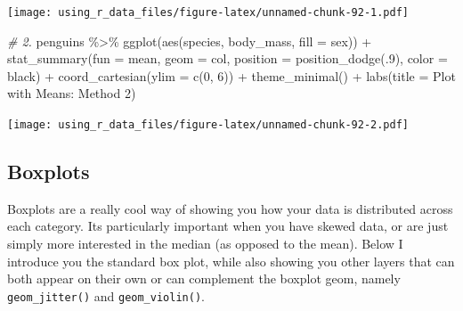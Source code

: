 \documentclass[
]{book}
\newenvironment{Shaded}{\begin{snugshade}}{\end{snugshade}}
\newcommand{\AttributeTok}[1]{\textcolor[rgb]{0.77,0.63,0.00}{#1}}
\newcommand{\CommentTok}[1]{\textcolor[rgb]{0.56,0.35,0.01}{\textit{#1}}}
\newcommand{\DecValTok}[1]{\textcolor[rgb]{0.00,0.00,0.81}{#1}}
\newcommand{\FunctionTok}[1]{\textcolor[rgb]{0.00,0.00,0.00}{#1}}
\newcommand{\NormalTok}[1]{#1}
\newcommand{\SpecialCharTok}[1]{\textcolor[rgb]{0.00,0.00,0.00}{#1}}
\newcommand{\StringTok}[1]{\textcolor[rgb]{0.31,0.60,0.02}{#1}}
\begin{document}
\texttt{[image: using\_r\_data\_files/figure-latex/unnamed-chunk-92-1.pdf]}

\begin{Shaded}
\begin{Highlighting}[]
\CommentTok{\# 2.}
\NormalTok{penguins }\SpecialCharTok{\%\textgreater{}\%} 
  \FunctionTok{ggplot}\NormalTok{(}\FunctionTok{aes}\NormalTok{(species, body\_mass, }\AttributeTok{fill =}\NormalTok{ sex)) }\SpecialCharTok{+}
  \FunctionTok{stat\_summary}\NormalTok{(}\AttributeTok{fun =}\NormalTok{ mean, }\AttributeTok{geom =} \StringTok{\textquotesingle{}col\textquotesingle{}}\NormalTok{, }\AttributeTok{position =} \FunctionTok{position\_dodge}\NormalTok{(.}\DecValTok{9}\NormalTok{), }
               \AttributeTok{color =} \StringTok{\textquotesingle{}black\textquotesingle{}}\NormalTok{) }\SpecialCharTok{+}
  \FunctionTok{coord\_cartesian}\NormalTok{(}\AttributeTok{ylim =} \FunctionTok{c}\NormalTok{(}\DecValTok{0}\NormalTok{, }\DecValTok{6}\NormalTok{)) }\SpecialCharTok{+}
  \FunctionTok{theme\_minimal}\NormalTok{() }\SpecialCharTok{+}
  \FunctionTok{labs}\NormalTok{(}\AttributeTok{title =} \StringTok{\textquotesingle{}Plot with Means: Method 2\textquotesingle{}}\NormalTok{)}
\end{Highlighting}
\end{Shaded}

\texttt{[image: using\_r\_data\_files/figure-latex/unnamed-chunk-92-2.pdf]}

\hypertarget{boxplots}{%
\subsection{Boxplots}\label{boxplots}}

Boxplots are a really cool way of showing you how your data is distributed across each category.
Its particularly important when you have skewed data, or are just simply more interested in the median (as opposed to the mean).
Below I introduce you the standard box plot, while also showing you other layers that can both appear on their own or can complement the boxplot geom, namely \texttt{geom\_jitter()} and \texttt{geom\_violin()}.
\end{document}
